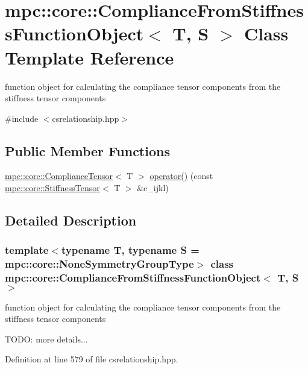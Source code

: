 \hypertarget{structmpc_1_1core_1_1_compliance_from_stiffness_function_object}{}\section{mpc\+:\+:core\+:\+:Compliance\+From\+Stiffness\+Function\+Object$<$ T, S $>$ Class Template Reference}
\label{structmpc_1_1core_1_1_compliance_from_stiffness_function_object}


function object for calculating the compliance tensor components from the stiffness tensor components  




{\ttfamily \#include $<$csrelationship.\+hpp$>$}

\subsection*{Public Member Functions}
\begin{DoxyCompactItemize}
\item 
\mbox{\hyperlink{structmpc_1_1core_1_1_compliance_tensor}{mpc\+::core\+::\+Compliance\+Tensor}}$<$ T $>$ \mbox{\hyperlink{structmpc_1_1core_1_1_compliance_from_stiffness_function_object_a448ccc3a0f1af070f75623e3a651fcb5}{operator()}} (const \mbox{\hyperlink{structmpc_1_1core_1_1_stiffness_tensor}{mpc\+::core\+::\+Stiffness\+Tensor}}$<$ T $>$ \&c\+\_\+ijkl)
\end{DoxyCompactItemize}


\subsection{Detailed Description}
\subsubsection*{template$<$typename T, typename S = mpc\+::core\+::\+None\+Symmetry\+Group\+Type$>$\newline
class mpc\+::core\+::\+Compliance\+From\+Stiffness\+Function\+Object$<$ T, S $>$}

function object for calculating the compliance tensor components from the stiffness tensor components 

T\+O\+DO\+: more details... 

Definition at line 579 of file csrelationship.\+hpp.



